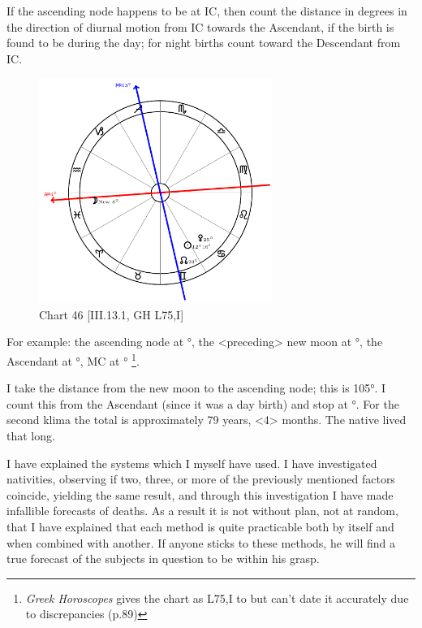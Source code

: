 If the ascending node happens to be at IC, then count the distance in degrees in the direction of diurnal motion
from IC towards the Ascendant, if the birth is found to be during the day; for night births count toward the Descendant from IC. 

\enlargethispage{2\baselineskip}
\clearpage
\begin{figure}
\centering
\includegraphics[width=0.68\textwidth]{charts/3_13_1}
\caption{Chart 46 [III.13.1, GH L75,I]}
\label{fig:chart46}
\end{figure}

For example: the ascending node at \Gemini\xspace 23°, the <preceding> new moon at \Pisces\xspace 8°, the Ascendant at \Pisces\xspace 4°, MC at \Sagittarius\xspace 13°
\footnote{\textit{Greek Horoscopes} gives the chart as L75,I to but can't date it accurately due to discrepancies (p.89)}. 

I take the distance from the new moon to the ascending node; this is 105°. I count this from the Ascendant (since it was a day birth) and stop at \Gemini\xspace 19°. For the second klima the total is approximately 79 years, <4> months. The native lived that long.

I have explained the systems which I myself have used. I have investigated nativities, observing if two, three, or more of the previously mentioned factors coincide, yielding the same result, and through this investigation I have made infallible forecasts of deaths. As a result it is not without plan, not at random, that I have explained that each method is quite practicable both by itself and when combined with another. If anyone sticks to these methods, he will find a true forecast of the subjects in question to be within his grasp. 

